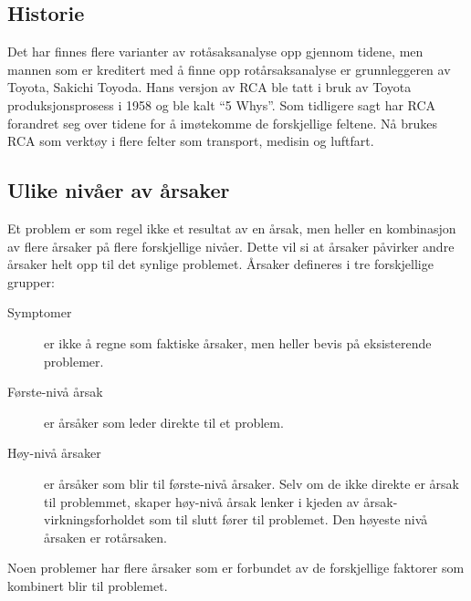\subsection{Historie}
Det har finnes flere varianter av rotåsaksanalyse opp gjennom tidene, men mannen som er kreditert med å finne opp rotårsaksanalyse er grunnleggeren av Toyota, Sakichi Toyoda. Hans versjon av RCA ble tatt i bruk av Toyota produksjonsprosess i 1958 og ble kalt ``5 Whys''. Som tidligere sagt har RCA forandret seg over tidene for å imøtekomme de forskjellige feltene. Nå brukes RCA som verktøy i flere felter som transport, medisin og luftfart\cite{Teori}. 
    
\subsection{Ulike nivåer av årsaker}
Et problem er som regel ikke et resultat av en årsak, men heller en kombinasjon av flere årsaker på flere forskjellige nivåer. Dette vil si at årsaker påvirker andre årsaker helt opp til det synlige problemet. Årsaker defineres i tre forskjellige grupper: 

\begin{description}
    \item[Symptomer] er ikke å regne som faktiske årsaker, men heller bevis på eksisterende problemer.
    \item[Første-nivå årsak] er årsåker som leder direkte til et problem.
    \item[Høy-nivå årsaker] er årsåker som blir til første-nivå årsaker. Selv om de ikke direkte er årsak til problemmet, skaper høy-nivå årsak lenker i kjeden av årsak-virkningsforholdet som til slutt fører til problemet. Den høyeste nivå årsaken er rotårsaken.  
\end{description}
Noen problemer har flere årsaker som er forbundet av de forskjellige faktorer som kombinert blir til problemet.

